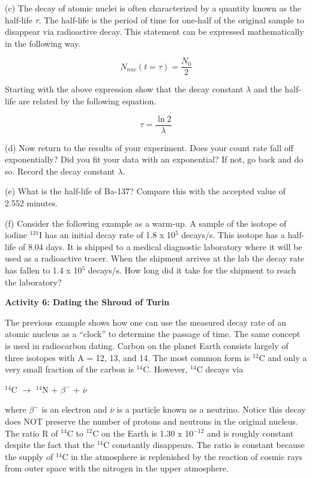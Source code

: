 (c) The decay of atomic nuclei is often characterized by a quantity
known as the half-life \( \tau  \). The half-life is the period of
time for one-half of the original sample to disappear via radioactive
decay. This statement can be expressed mathematically in the following
way.

\[
N_{nuc}(t=\tau )=\frac{N_{0}}{2}\]


Starting with the above expression show that the decay constant \( \lambda  \)
and the half-life are related by the following equation.

\[
\tau =\frac{\ln 2}{\lambda }\]


\vspace{1.5in}

(d) Now return to the results of your experiment.
Does your count rate fall off exponentially?
Did you fit your data with an exponential? If not,
go back and do so.
Record the decay constant $\lambda$.
\answerspace{0.75in}

\pagebreak[2]
(e) What is the half-life of Ba-137? Compare this with the accepted value of 2.552 minutes.
\answerspace{1.5in}

(f) Consider the following example as a warm-up. A sample of the isotope of iodine
\( ^{131} \)I has an initial decay rate of 1.8 x 10\( ^{5} \) decays/s.
This isotope has a half-life of 8.04 days. It is shipped to a medical
diagnostic laboratory where it will be used as a radioactive tracer.
When the shipment arrives at the lab the decay rate has fallen to
1.4 x 10\( ^{5} \) decays/s. How long did it take for the shipment
to reach the laboratory?
\vspace{2in}


\textbf{Activity 6: Dating the Shroud of Turin }

The previous example shows how one can use the measured decay rate
of an atomic nucleus as a {}``clock'' to determine the passage of
time. The same concept is used in radiocarbon dating. Carbon on the
planet Earth consists largely of three isotopes with A = 12, 13, and
14. The most common form is \( ^{12} \)C and only a very small fraction
of the carbon is \( ^{14} \)C. However, \( ^{14} \)C decays via 

{\centering \( ^{14} \)C \( \rightarrow  \) \( ^{14} \)N + \( \beta ^{-} \)
+ \( \overline{\nu } \)\par}

where \( \beta ^{-} \) is an electron and \( \overline{\nu } \)
is a particle known as a neutrino. Notice this decay does NOT preserve
the number of protons and neutrons in the original nucleus. The ratio
R of \( ^{14} \)C to \( ^{12} \)C on the Earth is 1.30 x 10\( ^{-12} \)
and is roughly constant despite the fact that the \( ^{14} \)C constantly
disappears. The ratio is constant because the supply of \( ^{14} \)C
in the atmosphere is replenished by the reaction of cosmic rays from
outer space with the nitrogen in the upper atmosphere.

